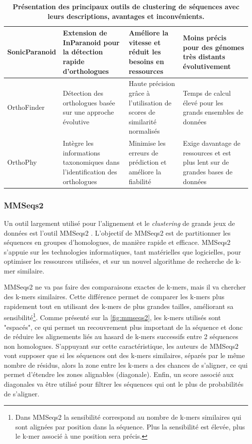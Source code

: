 \begin{table}[htbp]
\begin{tabular}{|p{}|p{}|p{}|p{}|}
\hline
SonicParanoid \cite{cosentino_sonicparanoid_2019} & Extension de InParanoid pour la détection rapide d'orthologues & Améliore la vitesse et réduit les besoins en ressources & Moins précis pour des génomes très distants évolutivement \\
\hline
OrthoFinder \cite{emms_orthofinder_2019} & Détection des orthologues basée sur une approche évolutive & Haute précision grâce à l'utilisation de scores de similarité normalisés & Temps de calcul élevé pour les grands ensembles de données \\
\hline
OrthoPhy \cite{watanabe_orthophy_2023} & Intègre les informations taxonomiques dans l'identification des orthologues & Minimise les erreurs de prédiction et améliore la fiabilité & Exige davantage de ressources et est plus lent sur de grandes bases de données \\
\hline
\end{tabular}
\caption[Outils de clustering des séquences]{\textbf{Présentation des principaux  outils de clustering de séquences avec leurs descriptions, avantages et inconvénients.}}
\label{tab:clustering}
\end{table}

\newpage
\subsubsection{MMSeqs2}

Un outil largement utilisé pour l'alignement et le \textit{clustering} de grands jeux de données est l'outil MMSeqs2 \cite{steinegger_mmseqs2_2017}. L'objectif de MMSeqs2 est de partitionner les séquences en groupes d'homologues, de manière rapide et efficace. MMSeqs2 s'appuie sur les technologies informatiques, tant matérielles que logicielles, pour optimiser les ressources utilisées, et sur un nouvel algorithme de recherche de k-mer similaire. 

MMSeqs2 ne va pas faire des comparaisons exactes de k-mers, mais il va chercher des k-mers similaires. Cette différence permet de comparer les k-mers plus rapidement tout en utilisant des k-mers de plus grandes tailles, améliorant sa sensibilité\footnote{Dans MMSeqs2 la sensibilité correspond au nombre de k-mers similaires qui sont alignées par position dans la séquence. Plus la sensibilité est élevée, plus le k-mer associé à une position sera précis.}. Comme présenté sur la \autoref{fig:mmseqs2}, les k-mers utilisés sont "espacés", ce qui permet un recouvrement plus important de la séquence et donc de réduire les alignements liés au hasard de k-mers successifs entre 2 séquences non homologues. S'appuyant sur cette caractéristique, les auteurs de MMSeqs2 vont supposer que si les séquences ont des k-mers similaires, séparés par le même nombre de résidus, alors la zone entre les k-mers a des chances de s'aligner, ce qui permet d'étendre les zones alignables (diagonale). Enfin, un score associé aux diagonales va être utilisé pour filtrer les séquences qui ont le plus de probabilités de s'aligner.

